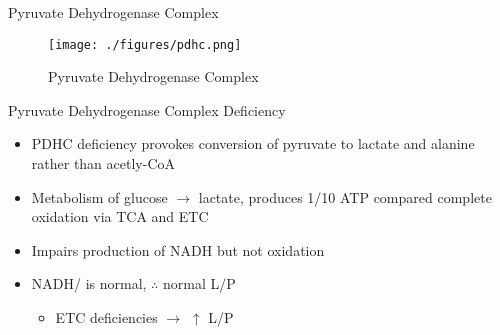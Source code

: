 \documentclass[presentation, smaller]{beamer}
\begin{document}
\begin{frame}[label={sec:orga32a488}]{Pyruvate Dehydrogenase Complex}
\begin{figure}[htbp]
\centering
\texttt{[image: ./figures/pdhc.png]}
\caption[pdhc]{\label{fig:org064ee5d}
Pyruvate Dehydrogenase Complex}
\end{figure}
\end{frame}
\begin{frame}[label={sec:org49b70e1}]{Pyruvate Dehydrogenase Complex Deficiency}
\begin{itemize}
\item PDHC deficiency provokes conversion of pyruvate to lactate and alanine rather than acetly-CoA
\item Metabolism of glucose \(\to\) lactate, produces 1/10 ATP compared
complete oxidation via TCA and ETC
\item Impairs production of NADH but not oxidation
\item NADH/ is normal, \(\therefore\) normal L/P
\begin{itemize}
\item ETC deficiencies \(\to\) \(\uparrow\) L/P
\end{itemize}
\end{itemize}
\end{frame}
\end{document}
